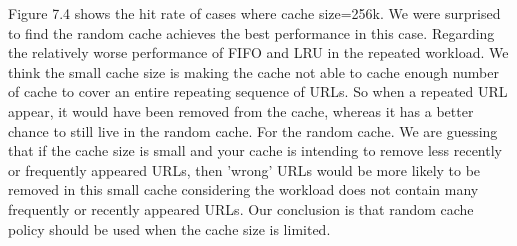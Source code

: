 \documentclass[paper=a4, fontsize=11pt]{scrartcl} %
\numberwithin{equation}{section} %
\numberwithin{figure}{section} %
\numberwithin{table}{section} %
\begin{document}
Figure 7.4 shows the hit rate of cases where cache size=256k. We were surprised to find the random cache achieves the best performance in this case. Regarding the relatively worse performance of FIFO and LRU in the repeated workload. We think the small cache size is making the cache not able to cache enough number of cache to cover an entire repeating sequence of URLs. So when a repeated URL appear, it would have been removed from the cache, whereas it has a better chance to still live in the random cache. For the random cache. We are guessing that if the cache size is small and your cache is intending to remove less recently or frequently appeared URLs, then 'wrong' URLs would be more likely to be removed in this small cache considering the workload does not contain many frequently or recently appeared URLs. Our conclusion is that random cache policy should be used when the cache size is limited.    
\end{document}
